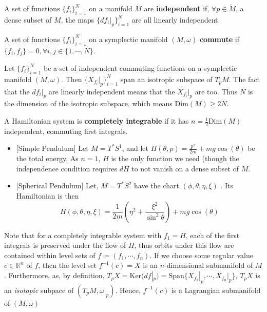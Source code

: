 \documentclass[11pt, final]{article}
\begin{document}
\begin{definition}
	A set of functions $\{f_i\}_{i=1}^N$ on a manifold $M$ are \textbf{independent} if, $\forall p \in \tilde{M}$, a dense subset of $M$, the maps $\{df_i|_p\}_{i=1}^N$ are all linearly independent.
\end{definition}

\begin{definition}
	A set of functions $\{f_i\}_{i=1}^N$ on a symplectic manifold $(M,\omega)$ \textbf{commute} if $\{f_i,f_j\} = 0, \forall i,j \in \{1,\cdots, N\}$.
\end{definition}

\begin{remark}
	Let $\{f_i\}_{i=1}^N$ be a set of independent commuting functions on a symplectic manifold $(M,\omega)$. Then $\{X_{f_i}|_p\}_{i=1}^N$ span an isotropic subspace of $T_pM$. The fact that the $df_i|_p$ are linearly independent means that the $X_{f_i}|_p$ are too. Thus $N$ is the dimension of the isotropic subspace, which means $\mathrm{Dim}(M) \geq 2N$.
\end{remark}

\begin{definition}
	A Hamiltonian system is \textbf{completely integrable} if it has $n = \tfrac{1}{2}\mathrm{Dim}(M)$ independent, commuting first integrals.
\end{definition}

\begin{example}
	\begin{itemize}
		\item {[Simple Pendulum]} Let $M = T^*S^1$, and let $H(\theta,p) = \tfrac{p^2}{2m} + mg\cos(\theta)$ be the total energy. As $n=1$, $H$ is the only function we need (though the independence condition requires $dH$ to not vanish on a dense subset of $M$.
		\item {[Spherical Pendulum]} Let, $M = T^*S^2$ have the chart $(\phi,\theta, \eta, \xi)$ . Its Hamiltonian is then
			\begin{equation}
				H(\phi, \theta, \eta, \xi) = \frac{1}{2m}\left( \eta^2 + \frac{\xi^2}{\sin^2 \theta} \right) + mg\cos(\theta)
			\end{equation}
	\end{itemize}
\end{example}

\begin{remark}
	Note that for a completely integrable system with $f_1 = H$, each of the first integrals is preserved under the flow of $H$, thus orbits under this flow are contained within level sets of $f \coloneqq (f_1,\cdots, f_n)$. If we choose some regular value $c \in \mathbb{R}^n$ of $f$, then the level set $f^{-1}(c)=X$ is an $n$-dimensional submanifold of $M$. Furthermore, as, by definition, $T_pX = \mathrm{Ker}(df|_p) = \mathrm{Span}\{X_{f_1}|_p, \cdots, X_{f_n}|_p\}$, $T_pX$ is an \textit{isotopic} subpace of $(T_pM,\omega|_p)$. Hence, $f^{-1}(c)$ is a Lagrangian submanifold of $(M,\omega)$
\end{remark}
\end{document}
